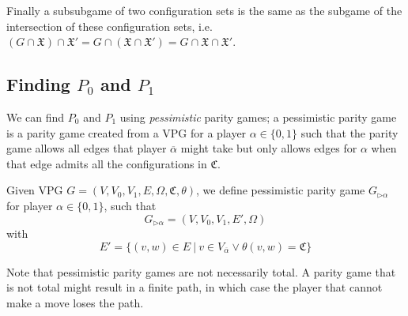Finally a subsubgame of two configuration sets is the same as the subgame of the intersection of these configuration sets, i.e. $(G \cap \mathfrak{X}) \cap \mathfrak{X}' = G \cap (\mathfrak{X} \cap \mathfrak{X}') = G \cap \mathfrak{X} \cap \mathfrak{X}'$.

\subsection{Finding $P_0$ and $P_1$}
We can find $P_0$ and $P_1$ using \textit{pessimistic} parity games; a pessimistic parity game is a parity game created from a VPG for a player $\alpha \in \{0,1\}$ such that the parity game allows all edges that player $\overline{\alpha}$ might take but only allows edges for $\alpha$ when that edge admits all the configurations in $\mathfrak{C}$.
\begin{definition}
	\label{def_pess_game}
	Given VPG $G = (V,V_0,V_1,E,\Omega, \mathfrak{C},\theta)$, we define pessimistic parity game $G_{\triangleright\alpha}$ for player $\alpha \in \{0,1\}$, such that
	\[ G_{\triangleright\alpha} = (V,V_0,V_1,E',\Omega ) \]
	with
	\[ E' = \{ (v,w) \in E\ |\ v \in V_{\overline{\alpha}} \vee \theta(v,w) = \mathfrak{C} \} \]
\end{definition}


Note that pessimistic parity games are not necessarily total. A parity game that is not total might result in a finite path, in which case the player that cannot make a move loses the path.


